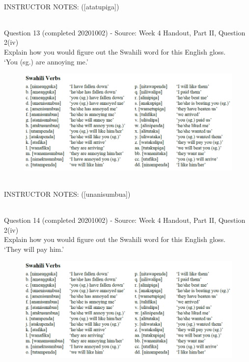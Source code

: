 \documentclass[12pt]{article}
\begin{document}
~\\
INSTRUCTOR NOTES: ([atatupiga])


~\\

{\large Question 13} (completed 20201002) - Source: Week 4 Handout, Part II, Question 2(iv)\\

Explain how you would figure out the Swahili word for this English gloss.\\

‘You (sg.) are annoying me.’

\begin{figure}[H]
\includegraphics{../images/swahiliverbs.png}
\end{figure}

~\\
INSTRUCTOR NOTES: ([unanisumbua])


~\\

{\large Question 14} (completed 20201002) - Source: Week 4 Handout, Part II, Question 2(iv)\\

Explain how you would figure out the Swahili word for this English gloss.\\

‘They will pay him.’

\begin{figure}[H]
\includegraphics{../images/swahiliverbs.png}
\end{figure}
\end{document}
